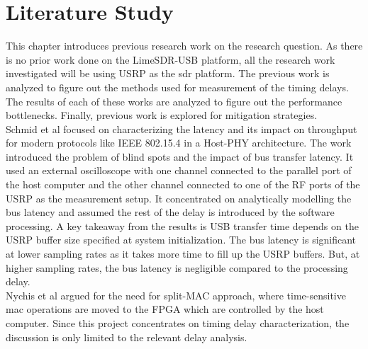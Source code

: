 \chapter{Literature Study}

This chapter introduces previous research work on the research question.
As there is no prior work done on the LimeSDR-USB platform, all the research work investigated will be using USRP as the \ac{sdr} platform.
The previous work is analyzed to figure out the methods used for measurement of the timing delays.
The results of each of these works are analyzed to figure out the performance bottlenecks.
Finally, previous work is explored for mitigation strategies.\\

Schmid et al \cite{schmid_experimental_2007} focused on characterizing the latency and its impact on throughput for modern protocols like IEEE 802.15.4 in a Host-PHY architecture.
The work introduced the problem of blind spots and the impact of bus transfer latency.
It used an external oscilloscope with one channel connected to the parallel port of the host computer and the other channel connected to one of the RF ports of the USRP as the measurement setup.
It concentrated on analytically modelling the bus latency and assumed the rest of the delay is introduced by the software processing.
A key takeaway from the results is USB transfer time depends on the USRP buffer size specified at system initialization.
The bus latency is significant at lower sampling rates as it takes more time to fill up the USRP buffers.
But, at higher sampling rates, the bus latency is negligible compared to the processing delay.
\\

Nychis et al \cite{nychis_enabling_nodate} argued for the need for split-MAC approach, where time-sensitive \ac{mac} operations are moved to the \ac{FPGA} which are controlled by the host computer.
Since this project concentrates on timing delay characterization, the discussion is only limited to the relevant delay analysis.\\

